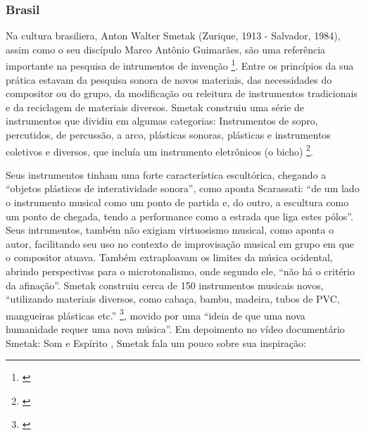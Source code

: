 
    
    


\subsubsection{Brasil}
Na cultura brasiliera, Anton Walter Smetak (Zurique, 1913 - Salvador, 1984), assim como o seu discípulo Marco Antônio Guimarães, são uma referência importante na pesquisa de intrumentos de invenção \footnote{\cite{Lima2018, Multimeios2001, Obici2014}}. Entre os princípios da sua prática estavam da pesquisa sonora de novos materiais, das necessidades do compositor ou do grupo, da modificação ou releitura de instrumentos tradicionais e da reciclagem de materiais diversos. Smetak construiu uma série de instrumentos que dividiu em algumas categorias: Instrumentos de sopro, percutidos, de percussão, a arco, plásticas sonoras, plásticas e instrumentos coletivos e diversos, que incluía um instrumento eletrônicos (o bicho) \footnote{\cite{Multimeios2001}}. 

Seus instrumentos tinham uma forte característica escultórica, chegando a ``objetos plásticos de interatividade sonora'', como aponta Scarassati: ``de um lado o instrumento musical como um ponto de partida e, do outro, a escultura como um ponto de chegada, tendo a performance como a estrada que liga estes pólos''. Seus intrumentos, também não exigiam virtuosismo musical, como aponta o autor, facilitando seu uso no contexto de improvisação musical em grupo em que o compositor atuava. Também extraploavam os limites da música ocidental, abrindo perspectivas para o microtonalismo, onde segundo ele, ``não há o critério da afinação''. Smetak construiu cerca de 150 instrumentos musicais novos, ``utilizando materiais diversos, como cabaça, bambu, madeira, tubos de PVC, mangueiras plásticas etc.'' \footnote{\cite{Andres2011}}, movido por uma ``ideia de que uma nova humanidade requer uma nova música''. Em depoimento no vídeo documentário Smetak: Som e Espírito \citeyear{JessicaSmetakPaoli2010}, Smetak fala um pouco sobre sua inspiração:


